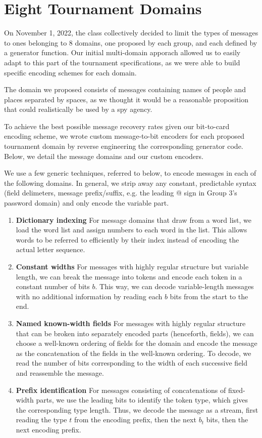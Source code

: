 \documentclass[titlepage]{article}
\begin{document}
\FloatBarrier

\section{Eight Tournament Domains} \label{domains}

On November 1, 2022, the class collectively decided to limit the types of messages to ones belonging to 8 domains, one proposed by each group, and each defined by a generator function. Our initial multi-domain apporach allowed us to easily adapt to this part of the tournament specifications, as we were able to build specific encoding schemes for each domain.

The domain we proposed consists of messages containing names of people and places separated by spaces, as we thought it would be a reasonable proposition that could realistically be used by a spy agency.

To achieve the best possible message recovery rates given our bit-to-card encoding scheme, we wrote custom message-to-bit encoders for each proposed tournament domain by reverse engineering the corresponding generator code. Below, we detail the message domains and our custom encoders.

We use a few generic techniques, referred to below, to encode messages in each of the following domains. In general, we strip away any constant, predictable syntax (field delimeters, message prefix/suffix, e.g. the leading @ sign in Group 3's password domain) and only encode the variable part.
\begin{enumerate}
    \item\textbf{Dictionary indexing} For message domains that draw from a word list, we load the word list and assign numbers to each word in the list. This allows words to be referred to efficiently by their index instead of encoding the actual letter sequence.
    \item\textbf{Constant widths} For messages with highly regular structure but variable length, we can break the message into tokens and encode each token in a constant number of bits $b$. This way, we can decode variable-length messages with no additional information by reading each $b$ bits from the start to the end.
    \item\textbf{Named known-width fields} For messages with highly regular structure that can be broken into separately encoded parts (henceforth, fields), we can choose a well-known ordering of fields for the domain and encode the message as the concatenation of the fields in the well-known ordering. To decode, we read the number of bits corresponding to the width of each successive field and reassemble the message.
    \item\textbf{Prefix identification} For messages consisting of concatenations of fixed-width parts, we use the leading bits to identify the token type, which gives the corresponding type length. Thus, we decode the message as a stream, first reading the type $t$ from the encoding prefix, then the next $b_t$ bits, then the next encoding prefix.
\end{enumerate}
\end{document}

